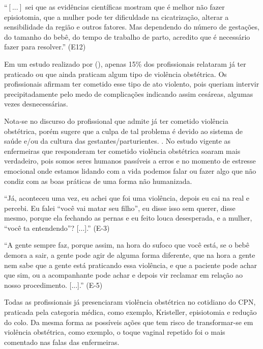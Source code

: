 \begin{citacao}
``$[...]$ sei que as evidências científicas mostram que é melhor não fazer episiotomia, que a mulher pode ter dificuldade na cicatrização, alterar a sensibilidade da região e outros fatores. Mas dependendo do número de gestações, do tamanho do bebê, do tempo de trabalho de parto, acredito que é necessário fazer para resolver.'' (E12)
\end{citacao}

Em um estudo realizado por \citeauthor{cardoso2017violencia} (\citeyear{cardoso2017violencia}), apenas 15\% dos profissionais relataram já ter praticado ou que ainda praticam algum tipo de violência obstétrica. Os profissionais afirmam ter cometido esse tipo de ato violento, pois queriam intervir precipitadamente pelo medo de complicações indicando assim cesáreas, algumas vezes desnecessárias. 

Nota-se no discurso do profissional que admite já ter cometido violência obstétrica, porém sugere que a culpa de tal problema é devido ao sistema de saúde e/ou da cultura das gestantes/parturientes. \cite{cardoso2017violencia}. No estudo vigente as enfermeiras que responderam ter cometido violência obstétrica soaram mais verdadeiro, pois somos seres humanos passíveis a erros e no momento de estresse emocional onde estamos lidando com a vida podemos falar ou fazer algo que não condiz com as boas práticas de uma forma não humanizada.

\begin{citacao}
``Já, aconteceu uma vez, eu achei que foi uma violência, depois eu cai na real e percebi. Eu falei ``você vai matar seu filho'', eu disse isso sem querer, disse mesmo, porque ela fechando as pernas e eu feito louca desesperada, e a mulher, ``você ta entendendo''? [...].'' (E-3)
\end{citacao}

\begin{citacao}
``A gente sempre faz, porque assim, na hora do sufoco que você está, se o bebê demora a sair, a gente pode agir de alguma forma diferente, que na hora a gente nem sabe que a gente está praticando essa violência, e que a paciente pode achar que sim, ou a acompanhante pode achar e depois vir reclamar em relação ao nosso procedimento. [...].'' (E-5)
\end{citacao}

Todas as profissionais já presenciaram violência obstétrica no cotidiano do CPN, praticada pela categoria médica, como exemplo, Kristeller, episiotomia e redução do colo. Da mesma forma as possíveis ações que tem risco de transformar-se em violência obstétrica, como exemplo, o toque vaginal repetido foi o mais comentado nas falas das enfermeiras.

